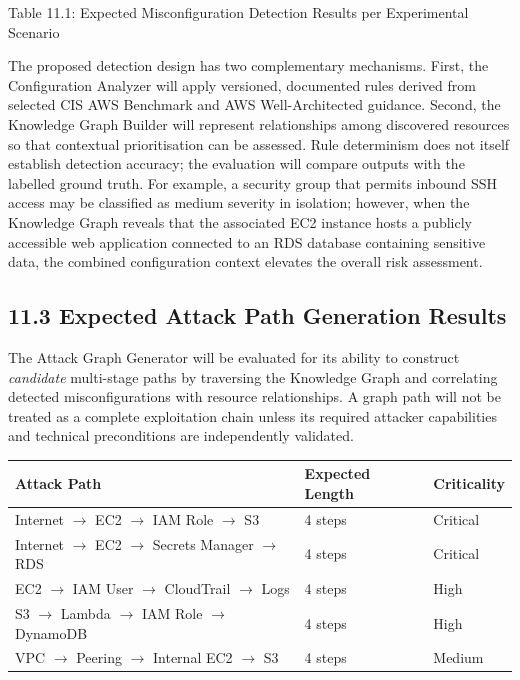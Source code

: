 Table 11.1: Expected Misconfiguration Detection Results per Experimental Scenario

The proposed detection design has two complementary mechanisms. First, the Configuration Analyzer will apply versioned, documented rules derived from selected CIS AWS Benchmark and AWS Well-Architected guidance. Second, the Knowledge Graph Builder will represent relationships among discovered resources so that contextual prioritisation can be assessed. Rule determinism does not itself establish detection accuracy; the evaluation will compare outputs with the labelled ground truth. For example, a security group that permits inbound SSH access may be classified as medium severity in isolation; however, when the Knowledge Graph reveals that the associated EC2 instance hosts a publicly accessible web application connected to an RDS database containing sensitive data, the combined configuration context elevates the overall risk assessment.

\subsection{11.3 Expected Attack Path Generation Results}

The Attack Graph Generator will be evaluated for its ability to construct \emph{candidate} multi-stage paths by traversing the Knowledge Graph and correlating detected misconfigurations with resource relationships. A graph path will not be treated as a complete exploitation chain unless its required attacker capabilities and technical preconditions are independently validated.

\begin{longtable}[]{@{}lll@{}}
\toprule\noalign{}
Attack Path & Expected Length & Criticality \\
\midrule\noalign{}
\endhead
\bottomrule\noalign{}
\endlastfoot
Internet $\rightarrow$ EC2 $\rightarrow$ IAM Role $\rightarrow$ S3 & 4 steps & Critical \\
Internet $\rightarrow$ EC2 $\rightarrow$ Secrets Manager $\rightarrow$ RDS & 4 steps & Critical \\
EC2 $\rightarrow$ IAM User $\rightarrow$ CloudTrail $\rightarrow$ Logs & 4 steps & High \\
S3 $\rightarrow$ Lambda $\rightarrow$ IAM Role $\rightarrow$ DynamoDB & 4 steps & High \\
VPC $\rightarrow$ Peering $\rightarrow$ Internal EC2 $\rightarrow$ S3 & 4 steps & Medium \\
\end{longtable}

